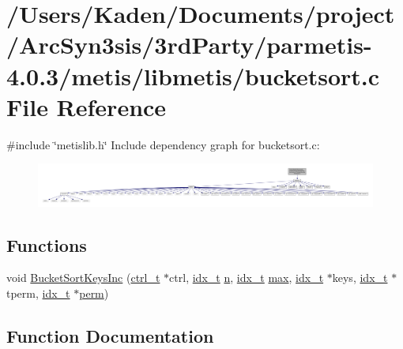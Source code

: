 \hypertarget{a00176}{}\section{/\+Users/\+Kaden/\+Documents/project/\+Arc\+Syn3sis/3rd\+Party/parmetis-\/4.0.3/metis/libmetis/bucketsort.c File Reference}
\label{a00176}
{\ttfamily \#include \char`\"{}metislib.\+h\char`\"{}}\newline
Include dependency graph for bucketsort.\+c\+:\nopagebreak
\begin{figure}[H]
\begin{center}
\leavevmode
\includegraphics[width=350pt]{a00177}
\end{center}
\end{figure}
\subsection*{Functions}
\begin{DoxyCompactItemize}
\item 
void \hyperlink{a00176_a255cc560df2c972c98aaf88644587f6d}{Bucket\+Sort\+Keys\+Inc} (\hyperlink{a00742}{ctrl\+\_\+t} $\ast$ctrl, \hyperlink{a00876_aaa5262be3e700770163401acb0150f52}{idx\+\_\+t} \hyperlink{a00623_a781a04ab095280f838ff3eb0e51312e0}{n}, \hyperlink{a00876_aaa5262be3e700770163401acb0150f52}{idx\+\_\+t} \hyperlink{a00593_affe776513b24d84b39af8ab0930fef7f}{max}, \hyperlink{a00876_aaa5262be3e700770163401acb0150f52}{idx\+\_\+t} $\ast$keys, \hyperlink{a00876_aaa5262be3e700770163401acb0150f52}{idx\+\_\+t} $\ast$tperm, \hyperlink{a00876_aaa5262be3e700770163401acb0150f52}{idx\+\_\+t} $\ast$\hyperlink{a00879_ab96e9eb84fc7c342d17690a1341645dd}{perm})
\end{DoxyCompactItemize}


\subsection{Function Documentation}
\mbox{\label{a00176_a255cc560df2c972c98aaf88644587f6d}} 
